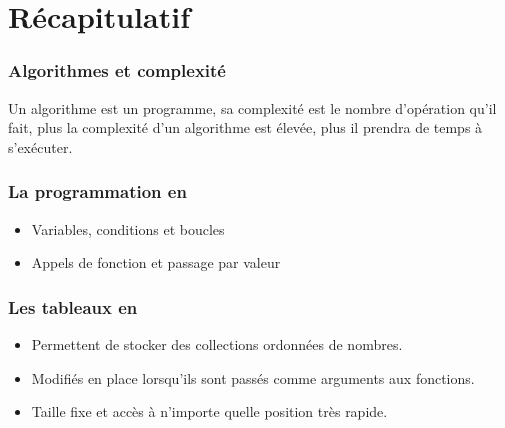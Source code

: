 \documentclass[aspectratio=169]{beamer}
\begin{document}
\section{Récapitulatif}
\begin{frame}
  \frametitle{Algorithmes et complexité}

  Un algorithme est un programme, sa complexité est le nombre d'opération qu'il
  fait, plus la complexité d'un algorithme est élevée, plus il prendra de temps
  à s'exécuter.

\end{frame}

\begin{frame}
  \frametitle{La programmation en \texorpdfstring{\Cpp}{C++}}

  \begin{itemize}
  \item Variables, conditions et boucles
  \item Appels de fonction et passage par valeur
  \end{itemize}

\end{frame}

\begin{frame}
  \frametitle{Les tableaux en \texorpdfstring{\Cpp}{C++}}

  \begin{itemize}
  \item Permettent de stocker des collections ordonnées de nombres.
  \item Modifiés en place lorsqu'ils sont passés comme arguments aux fonctions.
  \item Taille fixe et accès à n'importe quelle position très rapide.
  \end{itemize}

\end{frame}
\end{document}

